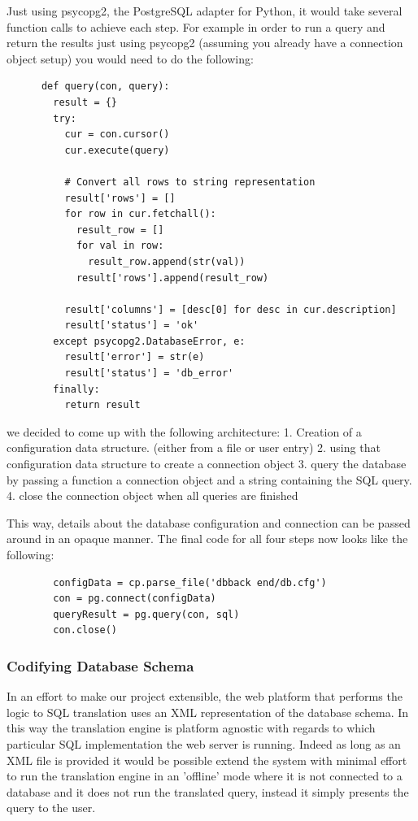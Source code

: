 \documentclass[a4paper, 11pt]{article}
\begin{document}
      Just using psycopg2, the PostgreSQL adapter for Python, it would take
      several function calls to achieve each step. For example in order to run a
      query and return the results just using psycopg2 (assuming you already
      have a connection object setup) you would need to do the following:

      \begin{verbatim}
      def query(con, query):
        result = {}
        try:
          cur = con.cursor()
          cur.execute(query)

          # Convert all rows to string representation
          result['rows'] = []
          for row in cur.fetchall():
            result_row = []
            for val in row:
              result_row.append(str(val))
            result['rows'].append(result_row)

          result['columns'] = [desc[0] for desc in cur.description]
          result['status'] = 'ok'
        except psycopg2.DatabaseError, e:
          result['error'] = str(e)
          result['status'] = 'db_error'
        finally:
          return result
      \end{verbatim}

      we decided to come up with the following architecture: 
      1. Creation of a configuration data structure. (either from a file or user
         entry)
      2. using that configuration data structure to create a connection object
      3. query the database by passing a function a connection object and a
      string containing the SQL query.
      4. close the connection object when all queries are finished

      This way, details about the database configuration and connection 
      can be passed around in an opaque manner. The final code for all four
      steps now looks like the following: 

      \begin{verbatim}
        configData = cp.parse_file('dbback end/db.cfg')
        con = pg.connect(configData)
        queryResult = pg.query(con, sql)
        con.close()
      \end{verbatim}

    \subsubsection{Codifying Database Schema}
      In an effort to make our project extensible, the web platform that performs 
      the logic to SQL translation uses an XML representation of the database
      schema. In this way the translation engine is platform agnostic with
      regards to which particular SQL implementation the web server is running.
      Indeed as long as an XML file is provided it would be possible extend the
      system with minimal effort to run the translation engine in an 'offline' mode 
      where it is not connected to a database and it does not run the translated 
      query, instead it simply presents the query to the user.
\end{document}
